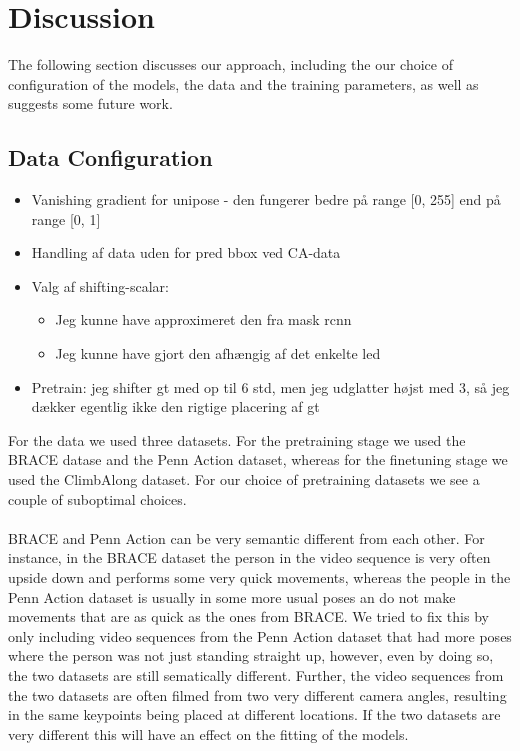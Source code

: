 \documentclass[./main.tex]{subfiles}
\begin{document}
\section{Discussion}
The following section discusses our approach, including the our choice of configuration of the models, the data and the training parameters, as well as suggests some future work.

\subsection{Data Configuration}
\begin{itemize}
    \item Vanishing gradient for unipose - den fungerer bedre på range [0, 255] end på range [0, 1]
    \item Handling af data uden for pred bbox ved CA-data
    \item Valg af shifting-scalar:
    \begin{itemize}
        \item Jeg kunne have approximeret den fra mask rcnn
        \item Jeg kunne have gjort den afhængig af det enkelte led
    \end{itemize}
    \item Pretrain: jeg shifter gt med op til 6 std, men jeg udglatter højst med 3, så jeg dækker egentlig ikke den rigtige placering af gt
\end{itemize}
For the data we used three datasets. For the pretraining stage we used the BRACE datase and the Penn Action dataset, whereas for the finetuning stage we used the ClimbAlong dataset. For our choice of pretraining datasets we see a couple of suboptimal choices. 
\\
\\
BRACE and Penn Action can be very semantic different from each other. For instance, in the BRACE dataset the person in the video sequence is very often upside down and performs some very quick movements, whereas the people in the Penn Action dataset is usually in some more usual poses an do not make movements that are as quick as the ones from BRACE. We tried to fix this by only including video sequences from the Penn Action dataset that had more poses where the person was not just standing straight up, however, even by doing so, the two datasets are still sematically different. Further, the video sequences from the two datasets are often filmed from two very different camera angles, resulting in the same keypoints being placed at different locations. If the two datasets are very different this will have an effect on the fitting of the models.
\end{document}

